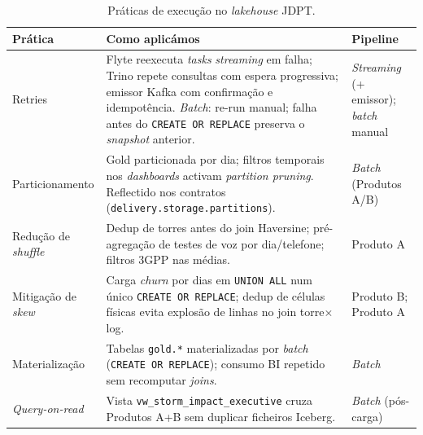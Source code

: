 \documentclass[runningheads]{llncs}
\begin{document}
\begin{table}[ht]
\centering
\caption{Práticas de execução no \textit{lakehouse} JDPT.}
\label{tab:exec-engineering}
\small
\renewcommand{\arraystretch}{1.12}
\begin{tabularx}{\textwidth}{@{}l X l@{}}
\toprule
\textbf{Prática} & \textbf{Como aplicámos} & \textbf{Pipeline} \\
\midrule
Retries &
Flyte reexecuta \textit{tasks} \textit{streaming} em falha; Trino repete consultas com espera progressiva; emissor Kafka com confirmação e idempotência. \textit{Batch}: re-run manual; falha antes do \texttt{CREATE OR REPLACE} preserva o \textit{snapshot} anterior. &
\textit{Streaming} (+ emissor); \textit{batch} manual \\
\addlinespace
Particionamento &
Gold particionada por dia; filtros temporais nos \textit{dashboards} activam \textit{partition pruning}. Reflectido nos contratos (\texttt{delivery.storage.partitions}). &
\textit{Batch} (Produtos A/B) \\
\addlinespace
Redução de \textit{shuffle} &
Dedup de torres antes do join Haversine; pré-agregação de testes de voz por dia/telefone; filtros 3GPP nas médias. &
Produto A \\
\addlinespace
Mitigação de \textit{skew} &
Carga \textit{churn} por dias em \texttt{UNION ALL} num único \texttt{CREATE OR REPLACE}; dedup de células físicas evita explosão de linhas no join torre$\times$log. &
Produto B; Produto A \\
\addlinespace
Materialização &
Tabelas \texttt{gold.*} materializadas por \textit{batch} (\texttt{CREATE OR REPLACE}); consumo BI repetido sem recomputar \textit{joins}. &
\textit{Batch} \\
\addlinespace
\textit{Query-on-read} &
Vista \texttt{vw\_storm\_impact\_executive} cruza Produtos A+B sem duplicar ficheiros Iceberg. &
\textit{Batch} (pós-carga) \\
\bottomrule
\end{tabularx}
\end{table}
\end{document}
